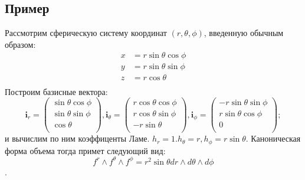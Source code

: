 \documentclass{article}
\begin{document}
\subsection*{Пример}
Рассмотрим сферическую систему координат $(r, \theta, \phi)$, введенную обычным образом:
\begin{align*}
    x & = r \sin \theta \cos \phi \\
    y &= r \sin \theta \sin \phi \\
    z &= r \cos \theta \\
\end{align*}
Построим базисные вектора:
$$ 
\mathbf{i}_r = \begin{pmatrix}
\sin \theta \cos \phi \\
\sin \theta \sin \phi \\
\cos \theta\\
\end{pmatrix},
\mathbf{i}_{\theta} =\begin{pmatrix}
r \cos \theta \cos \phi \\
r \cos \theta \sin \phi \\
-r \sin \theta\\
\end{pmatrix},
\mathbf{i}_{\phi} =\begin{pmatrix}
- r \sin \theta \sin \phi \\
r \sin \theta \cos \phi \\
0\\
\end{pmatrix};
$$
и вычислим по ним коэффиценты Ламе. $h_r = 1. h_\theta = r, h_\phi = r \sin \theta$.
Каноническая форма объема тогда примет следующий вид:
$$f^r \wedge f^\theta \wedge f^\phi = r^2 \sin \theta dr \wedge d \theta \wedge d \phi$$.

\newpage
\end{document}
